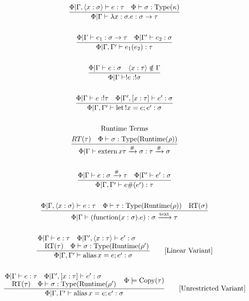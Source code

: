 \documentclass {article}
\begin{document}
\begin{gather*}
\frac
{\Phi | \Gamma, \langle x : \sigma \rangle \vdash e : \tau \quad \Phi \vdash \sigma : \text{Type} (\kappa)}
{\Phi | \Gamma \vdash \lambda x:\sigma. e : \sigma \to \tau } \\
\\
\frac
{\Phi | \Gamma \vdash e_1 : \sigma \to \tau \quad \Phi | \Gamma' \vdash e_2 : \sigma}
{\Phi | \Gamma, \Gamma' \vdash e_1(e_2) : \tau} \\
\\
\frac
{\Phi | \Gamma \vdash e : \sigma \quad \langle x : \tau \rangle \notin \Gamma }
{\Phi | \Gamma \vdash !e : !\sigma } \\
\\
\frac
{\Phi | \Gamma \vdash e : !\tau \quad \Phi | \Gamma', [x : \tau] \vdash e' : \sigma }
{\Phi | \Gamma, \Gamma' \vdash \text{let} \, !x = e; e' : \sigma}  \\
\\
\text{Runtime Terms}
\\
\frac
{RT(\tau) \quad \Phi \vdash \sigma : \text{Type}(\text{Runtime} (\rho))}
{\Phi | \Gamma \vdash \text{extern} \, x \tau \xrightarrow{\#} \sigma : \tau \xrightarrow{\#} \sigma} \\
\\
\frac
{\Phi | \Gamma \vdash e : \sigma \xrightarrow{\#} \tau \quad \Phi | \Gamma' \vdash e' : \sigma}
{\Phi | \Gamma, \Gamma' \vdash e\#(e') : \tau} \\
\\
\frac
{\Phi | \Gamma, \langle x : \sigma \rangle \vdash e : \tau \quad \Phi \vdash \tau : \text{Type}(\text{Runtime}(\rho)) \quad \text{RT}(\sigma)}
{\Phi | \Gamma \vdash (\text{function}(x : \sigma). e) : \sigma \xrightarrow{\text{text}} \tau} \\
\\
\frac
{\splitfrac{ \Phi | \Gamma \vdash e : \tau \quad \Phi | \Gamma', \langle x : \tau \rangle \vdash e' : \sigma}
{\text{RT}(\tau) \quad \Phi \vdash \sigma : \text{Type}(\text{Runtime}(\rho') }}
{\Phi | \Gamma, \Gamma' \vdash \text{alias} \, x = e; e' : \sigma} \tag*{[Linear Variant]} \\
\\
\frac
{\splitfrac{ \Phi | \Gamma \vdash e : \tau \quad \Phi | \Gamma', [x : \tau] \vdash e' : \sigma}
{\text{RT}(\tau) \quad \Phi \vdash \sigma : \text{Type}(\text{Runtime}(\rho')} \quad \Phi \models \text{Copy}(\tau)}
{\Phi | \Gamma, \Gamma' \vdash \text{alias} \, x = e; e' : \sigma} \tag*{[Unrestricted Variant]}\\
\\

\end{gather*}
\end{document}
